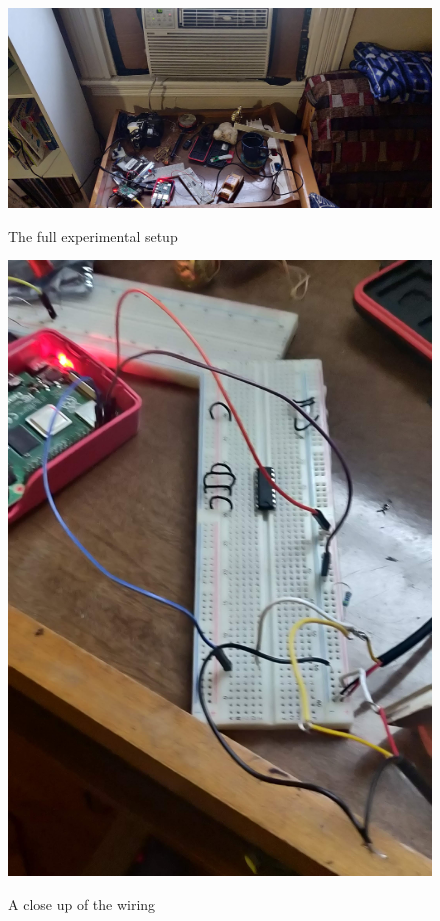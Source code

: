\documentclass[12pt]{article}
\begin{document}
\begin{figure}
	\includegraphics[scale=0.1]{full_setup.jpg}
	\centering
	\label{fig2}
	\caption{The full experimental setup}
\end{figure}

\begin{figure}
	\includegraphics[scale=0.1]{wiring.jpg}
	\centering
	\label{fig3}
	\caption{A close up of the wiring}
\end{figure}
\end{document}

